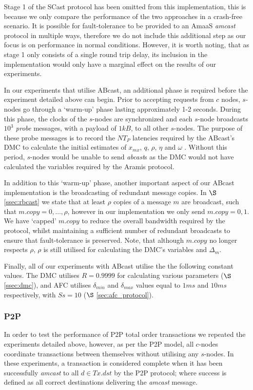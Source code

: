     Stage 1 of the \textsf{SCast} protocol has been omitted from this implementation, this is because we only compare the performance of the two approaches in a crash-free scenario.  It is possible for fault-tolerance to be provided to an \textsf{AmaaS} \emph{amcast} protocol in multiple ways, therefore we do not include this additional step as our focus is on performance in normal conditions.  However, it is worth noting, that as stage 1 only consists of a single round trip delay, its inclusion in the implementation would only have a marginal effect on the results of our experiments.  	
	
    In our experiments that utilise \textsf{ABcast}, an additional phase is required before the experiment detailed above can begin.  Prior to accepting requests from $c$ nodes, $s$-nodes go through a \textquoteleft{}warm-up' phase lasting approximately 1-2 seconds.  During this phase, the clocks of the $s$-nodes are synchronized and each $s$-node broadcasts $10^3$ \emph{probe} messages, with a payload of $1kB$, to all other $s$-nodes.  The purpose of these probe messages is to record the $NT_P$ latencies required by the \textsf{ABcast}'s DMC to calculate the initial estimates of $x_{mx}$, $q$, $\rho$, $\eta$ and $\omega$ .  Without this period, $s$-nodes would be unable to send \emph{abcast}s as the DMC would not have calculated the variables required by the Aramis protocol.  
    
    In addition to this \textquoteleft{}warm-up' phase, another important aspect of our \textsf{ABcast} implementation is the broadcasting of redundant message copies.  In $\S$ \ref{ssec:rbcast} we  state that at least $\rho$ copies of a message $m$ are broadcast, such that $m.copy = 0,\ldots,\rho$, however in our implementation we only send $m.copy = 0,1$.  We have \textquoteleft{}capped' $m.copy$ to reduce the overall bandwidth required by the protocol, whilst maintaining a sufficient number of redundant broadcasts to ensure that fault-tolerance is preserved.  Note, that although $m.copy$ no longer respects $\rho$, $\rho$ is still utilised for calculating the DMC's variables and $\Delta_m$.  
    
    Finally, all of our experiments with \textsf{ABcast} utilise the the following constant values.  The DMC utilises $R=0.9999$ for calculating various parameters ($\S$ \ref{ssec:dmc}), and AFC utilises $\delta_{min}$ and $\delta_{max}$ values equal to $1ms$ and $10ms$ respectively, with $Ss = 10$ ($\S$ \ref{sec:afc_protocol}).  
	
	\subsubsection*{P2P}
	In order to test the performance of P2P total order transactions we repeated the experiments detailed above, however, as per the P2P model, all $c$-nodes coordinate transactions between themselves without utilising any $s$-nodes.  In these experiments, a transaction is considered complete when it has been successfully \emph{amcast} to all $d \in Tx.dst$ by the P2P protocol; where success is defined as all correct destinations delivering the \emph{amcast} message. 
	
